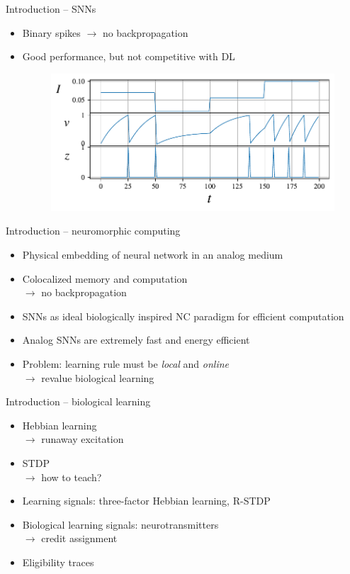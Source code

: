 \documentclass[t]{beamer}
\begin{document}
  \begin{frame}{Introduction -- SNNs}
    \begin{itemize}[label=--]
      \item Binary spikes $\rightarrow$ no backpropagation
      \item Good performance, but not competitive with DL

    \begin{figure}[!ht]
      \centering
      \includegraphics[width=\linewidth]{simplesnn}
    \end{figure}
    \end{itemize}
  \end{frame}

  \begin{frame}{Introduction -- neuromorphic computing}
    \begin{itemize}[label=--]
      \item Physical embedding of neural network in an analog medium
      \item Colocalized memory and computation \\$\rightarrow$ no backpropagation
      \item SNNs as ideal biologically inspired NC paradigm for efficient computation
      \item Analog SNNs are extremely fast and energy efficient
      \item Problem: learning rule must be \emph{local} and \emph{online}\\$\rightarrow$ revalue biological learning
    \end{itemize}

  \end{frame}

  \begin{frame}{Introduction -- biological learning}
    \begin{itemize}[label=--]
      \item Hebbian learning \\$\rightarrow$ runaway excitation
      \item STDP \\$\rightarrow$ how to teach?
      \item Learning signals: three-factor Hebbian learning, R-STDP
      \item Biological learning signals: neurotransmitters\\$\rightarrow$ credit assignment
      \item Eligibility traces
    \end{itemize}
  \end{frame}
\end{document}
